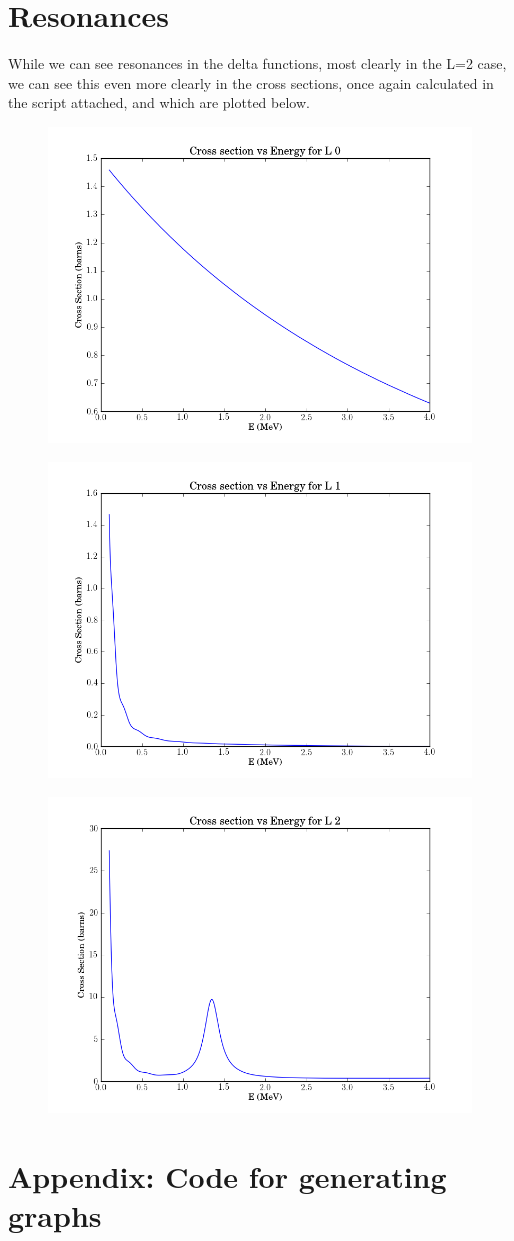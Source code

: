 \documentclass[11pt]{article} %
\begin{document}
\section{Resonances}

While we can see resonances in the delta functions, most clearly in the L=2 case, we can see this even more clearly in the cross sections, once again calculated in the script attached, and which are plotted below.\\


\vspace{.1mm}
\begin{figure}[H]
\centering
\includegraphics[width=.6\linewidth]{CrossSectionL0}
\end{figure}
\vspace{.1mm}
\vspace{.1mm}
\begin{figure}[H]
\centering
\includegraphics[width=.6\linewidth]{CrossSectionL1}
\end{figure}
\vspace{.1mm}

\vspace{.1mm}
\begin{figure}[H]
\centering
\includegraphics[width=.6\linewidth]{CrossSectionL2}
\end{figure}
\vspace{.1mm}
\section{Appendix: Code for generating graphs}

\end{document}
